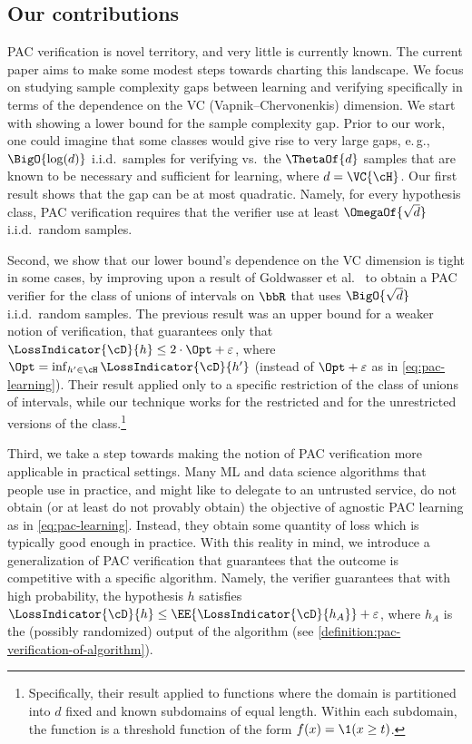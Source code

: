 \documentclass[11pt]{article}
\newcommand{\eg}{e.\,g.}
\begin{document}
\subsection{Our contributions}

PAC verification is novel territory, and very little is currently known. The current paper aims to make some modest steps towards charting this landscape. We focus on studying sample complexity gaps between learning and verifying specifically in terms of the dependence on the VC (Vapnik--Chervonenkis) dimension. 
We start with showing a lower bound for the sample complexity gap. Prior to our work, one could imagine that some classes would give rise to very large gaps, \eg, $\BigO{\log(d)}$ i.i.d.\ samples for verifying vs.\ the $\ThetaOf{d}$ samples that are known to be necessary and sufficient for learning, where $d = \VC{\cH}$. Our first result shows that the gap can be at most quadratic. Namely, for every hypothesis class, PAC verification requires that the verifier use at least $\OmegaOf{\sqrt{d}}$ i.i.d.\ random samples.

Second, we show that our lower bound's dependence on the VC dimension is tight in some cases, by improving upon a result of Goldwasser et al.\ \cite{GoldwasserRSY21} to obtain a PAC verifier for the class of unions of intervals on $\bbR$ that uses $\BigO{\sqrt{d}}$ i.i.d.\ random samples. The previous result was an upper bound for a weaker notion of verification, that guarantees only that $\LossIndicator{\cD}{h} \leq 2\cdot \Opt + \varepsilon$, where $\Opt = \inf_{h' \in \cH} \LossIndicator{\cD}{h'}$ (instead of $\Opt + \varepsilon$ as in \cref{eq:pac-learning}). Their result applied only to a specific restriction of the class of unions of intervals, while our technique works for the restricted and for the unrestricted versions of the class.\footnote{%
	Specifically, their result applied to functions where the domain is partitioned into $d$ fixed and known subdomains of equal length. Within each subdomain, the function is a threshold function of the form $f(x) = \1(x \geq t)$.%
}

Third, we take a step towards making the notion of PAC verification more applicable in practical settings. Many ML and data science algorithms that people use in practice, and might like to delegate to an untrusted service, do not obtain (or at least do not provably obtain) the objective of agnostic PAC learning as in \cref{eq:pac-learning}. Instead, they obtain some quantity of loss which is typically good enough in practice. With this reality in mind, we introduce a generalization of PAC verification that guarantees that the outcome is competitive with a specific algorithm. Namely, the verifier guarantees that with high probability, the hypothesis $h$ satisfies $\LossIndicator{\cD}{h} \leq \EE{\LossIndicator{\cD}{h_A}} + \varepsilon$, where $h_A$ is the (possibly randomized) output of the algorithm (see \cref{definition:pac-verification-of-algorithm}).
\end{document}
